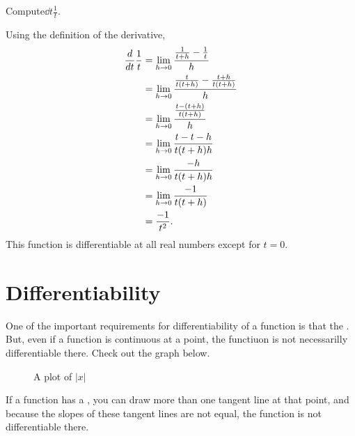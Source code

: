 \begin{example}
Compute$\displaystyle\dd t \frac{1}{t}.$\\
    \begin{solution}
    Using the definition of the derivative,
    \begin{align*}
    \displaystyle\frac{d }{d t}\frac{1}{t}&=\displaystyle\lim\limits_{ h\to0}\frac{\frac{1}{t+ h} - \frac{1}{t}}{h} \\
    &=\displaystyle\lim\limits_{h\to0}\frac{\frac{t}{t(t+ h)} - \frac{t+ h}{t(t+ h)}}{h} \\
    &=\displaystyle\lim\limits_{h\to0}\frac{\frac{t-(t+ h)}{t(t+ h)}}{h} \\
    &=\displaystyle\lim\limits_{h\to0}\frac{t-t- h}{t(t+ h) h} \\
    &=\displaystyle\lim\limits_{h\to0}\frac{- h}{t(t+ h) h} \\
    &=\displaystyle\lim\limits_{h\to0}\frac{-1}{t(t+ h)}\\
    &=\frac{-1}{t^2}.
    \end{align*}
    This function is differentiable at all real numbers except for $t=0$.
    \end{solution}
\end{example}

\clearpage
\section{Differentiability}
One of the important requirements for differentiability of a function is that the . But, even if a function is continuous at a point, the functiuon is not necessarilly differentiable there. Check out the graph below.

\begin{figure}[H]
    \centering
    \caption{A plot of $|x|$}
    \label{plot:cusp}
\end{figure}

If a function has a , you can draw more than one tangent line at that point, and because the slopes of these tangent lines are not equal, the function is not differentiable there.

